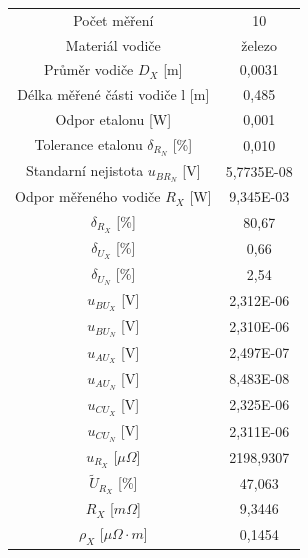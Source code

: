 \documentclass[a4paper, czech]{article}
\begin{document}
\begin{table}[H]
    \begin{tabular}{cc}
        \hline
        \cellcolor{lightgray}    Počet měření                     & \cellcolor{lightgray!50} 10         \\
        \cellcolor{lightgray} Materiál vodiče                       & \cellcolor{lightgray!50} železo     \\
        \cellcolor{lightgray} Průměr vodiče $D_X$ {[}m{]}              & \cellcolor{lightgray!50} 0,0031     \\
        \cellcolor{lightgray} Délka měřené části vodiče l {[}m{]}   & \cellcolor{lightgray!50} 0,485      \\
        \cellcolor{lightgray} Odpor etalonu {[}W{]}                 & \cellcolor{lightgray!50} 0,001      \\
        \cellcolor{lightgray} Tolerance etalonu $\delta_{R_N}$ {[}\%{]}        & \cellcolor{lightgray!50} 0,010      \\
        Standarní nejistota $u_{BR_N}$ {[}V{]}      & 5,7735E-08 \\
        Odpor měřeného vodiče $R_X$ {[}W{]}      & 9,345E-03  \\
        $\delta_{R_X}$ {[}\%{]}                          & 80,67      \\
        $\delta_{U_X}$ {[}\%{]}                          & 0,66       \\
        $\delta_{U_N}$ {[}\%{]}                          & 2,54       \\
        $u_{BU_X}$ {[}V{]}                          & 2,312E-06  \\
        $u_{BU_N}$ {[}V{]}                          & 2,310E-06  \\
        $u_{AU_X}$ {[}V{]}                          & 2,497E-07  \\
        $u_{AU_N}$ {[}V{]}                          & 8,483E-08  \\
        $u_{CU_X}$ {[}V{]}                          & 2,325E-06  \\
        $u_{CU_N}$ {[}V{]}                          & 2,311E-06  \\
        \cellcolor{lightgray} $u_{R_X}$ [$\mu \Omega$]                          & \cellcolor{lightgray!50} 2198,9307  \\
        \cellcolor{lightgray} $\tilde{U}_{R_X}$ [\%]                     & \cellcolor{lightgray!50} 47,063     \\
        \cellcolor{lightgray} $R_X$ [$m \Omega$]                  & \cellcolor{lightgray!50} 9,3446     \\
        \cellcolor{lightgray} $\rho_X$ [$\mu \Omega \cdot m$]                       & \cellcolor{lightgray!50} 0,1454       \\
        \hline
    \end{tabular}
\end{table}
\end{document}
